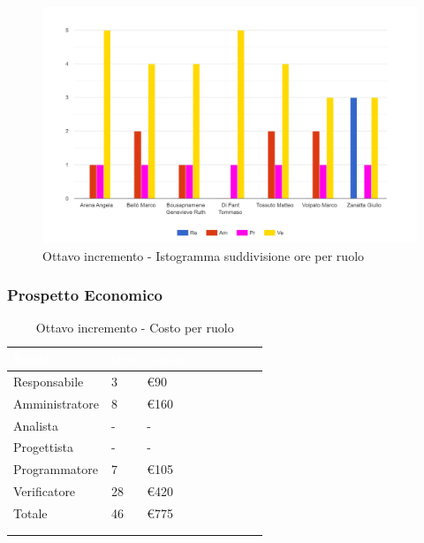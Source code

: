 {{      \begin{figure}[H]
        \includegraphics[width=15cm]{sezioni/images/ottavo.png}
        \centering
        \caption{Ottavo incremento - Istogramma suddivisione ore per ruolo}
     \end{figure}
    }

    \subsubsection{Prospetto Economico}
    {
        \setlength{\freewidth}{\dimexpr\textwidth-30\tabcolsep}
        \renewcommand{\arraystretch}{1.0}
        \setlength{\aboverulesep}{0pt}
        \setlength{\belowrulesep}{0pt}
        \begin{longtable}{C{.4\freewidth} C{.2\freewidth} C{.2\freewidth} C{.2\freewidth} C{.2\freewidth} C{.2\freewidth} C{.2\freewidth} C{.2\freewidth} C{.2\freewidth}}
          \toprule
        \textcolor{white}{\textbf{Ruolo}}&
        \textcolor{white}{\textbf{Ore}}&
        \textcolor{white}{\textbf{Costo}}\\
        \toprule
        \endhead
            
        Responsabile  & 3 & \euro90\\
        Amministratore  & 8 & \euro160 \\
        Analista &- & -\\
        Progettista &- &-\\
        Programmatore &7 & \euro105\\
        Verificatore &28 &\euro420\\
        Totale&46&\euro775\\
        \bottomrule
      \\
        \caption{Ottavo incremento - Costo per ruolo}
        \end{longtable}

}}
